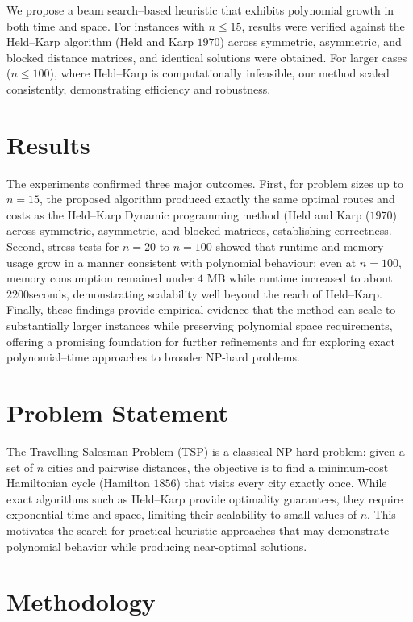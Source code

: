 \documentclass[sn-mathphys]{article}
\theoremstyle{thmstyleone}%
\theoremstyle{thmstyletwo}%
\theoremstyle{thmstylethree}%
\begin{document}
We propose a beam search--based heuristic that exhibits polynomial growth in both time and space. For instances with $n \leq 15$, results were verified against the Held--Karp algorithm (Held and Karp $1970$) across symmetric, asymmetric, and blocked distance matrices, and identical solutions were obtained. For larger cases ($n \leq 100$), where Held--Karp is computationally infeasible, our method scaled consistently, demonstrating efficiency and robustness.


\section{Results}\label{sec2}
The experiments confirmed three major outcomes.
First, for problem sizes up to $n=15$, the proposed algorithm produced exactly the same optimal routes and costs as the Held--Karp Dynamic programming method (Held and Karp ($1970$) across symmetric, asymmetric, and blocked matrices, establishing correctness.
Second, stress tests for $n=20$ to $n=100$ showed that runtime and memory usage grow in a manner consistent with polynomial behaviour; even at $n=100$, memory consumption remained under $4$ MB while runtime increased to about $2200$seconds, demonstrating scalability well beyond the reach of Held--Karp.
Finally, these findings provide empirical evidence that the method can scale to substantially larger instances while preserving polynomial space requirements, offering a promising foundation for further refinements and for exploring exact polynomial--time approaches to broader NP-hard problems.

\section{Problem Statement}

The Travelling Salesman Problem (TSP) is a classical NP-hard problem: 
given a set of $n$ cities and pairwise distances, the objective is to find a 
minimum-cost Hamiltonian cycle (Hamilton $1856$) that visits every city exactly once. 
While exact algorithms such as Held--Karp provide optimality guarantees, 
they require exponential time and space, limiting their scalability 
to small values of $n$. This motivates the search for practical 
heuristic approaches that may demonstrate polynomial behavior 
while producing near-optimal solutions.

\section{Methodology}
\end{document}

